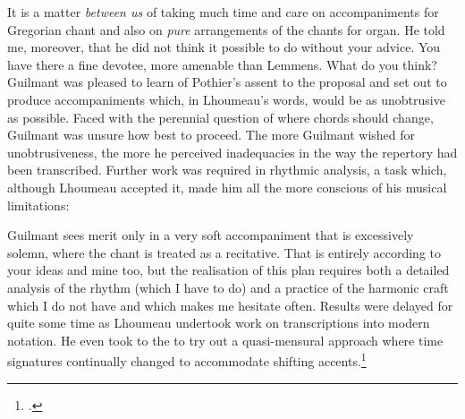   {}
{It is a matter \emph{between us} of taking much time and care on accompaniments for Gregorian chant and also on \emph{pure} arrangements of the chants for organ. He told me, moreover, that he did not think it possible to do without your advice. You have there a fine devotee, more amenable than Lemmens. What do you think?}
\noindent
Guilmant was pleased to learn of Pothier's assent to the proposal and set out to produce accompaniments which, in Lhoumeau's words, would be as unobtrusive as possible.
Faced with the perennial question of where chords should change, Guilmant was unsure how best to proceed.
The more Guilmant wished for unobtrusiveness, the more he perceived inadequacies in the way the repertory had been transcribed.
Further work was required in rhythmic analysis, a task which, although Lhoumeau accepted it, made him all the more conscious of his musical limitations:
\pagebreak{}

  {}
{Guilmant sees merit only in a very soft accompaniment that is excessively solemn, where the chant is treated as a recitative. That is entirely according to your ideas and mine too, but the realisation of this plan requires both a detailed analysis of the rhythm (which I have to do) and a practice of the harmonic craft which I do not have and which makes me hesitate often.}
\noindent
Results were delayed for quite some time as Lhoumeau undertook work on transcriptions into modern notation.
He even took to the \tsg{} to try out a quasi-mensural approach where time signatures continually changed to accommodate shifting accents.\footcite[6]{Lhoumeauplainchantorgue1895}

